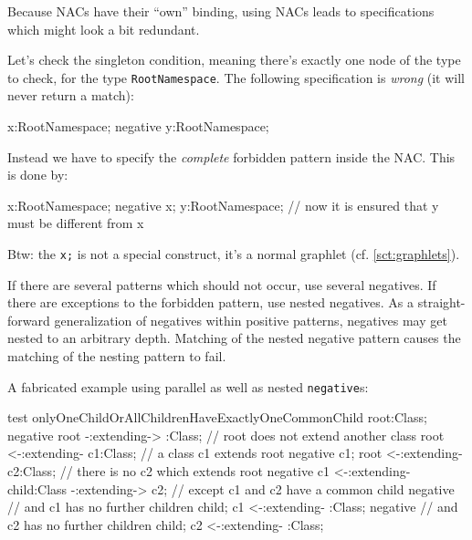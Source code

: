 Because NACs have their ``own'' binding, using NACs leads to specifications which might look a bit redundant.

  \begin{example}
    Let's check the singleton condition, meaning there's exactly one node of the type to check, for the type \texttt{RootNamespace}.
    The following specification is \emph{wrong} (it will never return a match):
    \begin{grgen}
  x:RootNamespace;
  negative {
    y:RootNamespace;
  }
    \end{grgen}
	
    Instead we have to specify the \emph{complete} forbidden pattern inside the NAC. This is done by:
    
	\begin{grgen}
  x:RootNamespace;
  negative {
    x;
    y:RootNamespace; // now it is ensured that y must be different from x
  }
    \end{grgen}
	
	Btw: the \texttt{x;} is not a special construct, it's a normal graphlet (cf. \ref{sct:graphlets}).
	
  \end{example} 

If there are several patterns which should not occur, use several negatives.
If there are exceptions to the forbidden pattern, use nested negatives.
As a straight-forward generalization of negatives within positive patterns, negatives may get nested to an arbitrary depth.
Matching of the nested negative pattern causes the matching of the nesting pattern to fail.

\begin{example}
  A fabricated example using parallel as well as nested \texttt{negative}s:
  \begin{grgen}
test onlyOneChildOrAllChildrenHaveExactlyOneCommonChild
{
  root:Class;
  negative {
    root -:extending-> :Class; // root does not extend another class
  }
  root <-:extending- c1:Class; // a class c1 extends root
  negative {
    c1;
    root <-:extending- c2:Class; // there is no c2 which extends root
    negative {
      c1 <-:extending- child:Class -:extending-> c2; // except c1 and c2 have a common child
      negative { // and c1 has no further children
        child;
        c1 <-:extending- :Class;
      }
      negative { // and c2 has no further children
        child;
        c2 <-:extending- :Class; 
      }
    }
  }
}
  \end{grgen}
\end{example}

